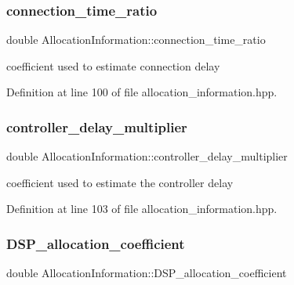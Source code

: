 \subsubsection{\texorpdfstring{connection\+\_\+time\+\_\+ratio}{connection\_time\_ratio}}
{\footnotesize\ttfamily double Allocation\+Information\+::connection\+\_\+time\+\_\+ratio\hspace{0.3cm}{\ttfamily [private]}}



coefficient used to estimate connection delay 



Definition at line 100 of file allocation\+\_\+information.\+hpp.

\mbox{\label{classAllocationInformation_a5c4f2f79bd43d7a6d0c1d60d9afa4f09}} 
\subsubsection{\texorpdfstring{controller\+\_\+delay\+\_\+multiplier}{controller\_delay\_multiplier}}
{\footnotesize\ttfamily double Allocation\+Information\+::controller\+\_\+delay\+\_\+multiplier\hspace{0.3cm}{\ttfamily [private]}}



coefficient used to estimate the controller delay 



Definition at line 103 of file allocation\+\_\+information.\+hpp.

\mbox{\label{classAllocationInformation_aa1e75c4aa5851a5e9efb33a3226558e4}} 
\subsubsection{\texorpdfstring{D\+S\+P\+\_\+allocation\+\_\+coefficient}{DSP\_allocation\_coefficient}}
{\footnotesize\ttfamily double Allocation\+Information\+::\+D\+S\+P\+\_\+allocation\+\_\+coefficient\hspace{0.3cm}{\ttfamily [private]}}




